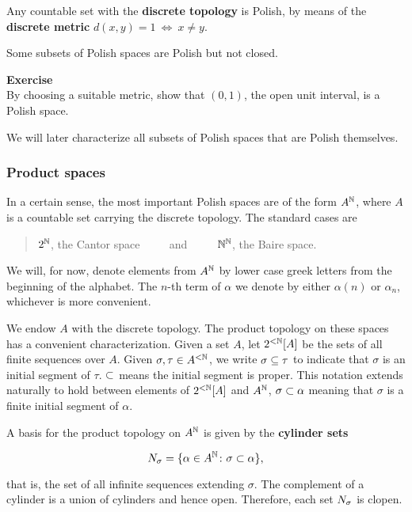 Any countable set with the \textbf{discrete topology} is Polish, by means of the \textbf{discrete metric} $d(x,y) = 1 \: \Leftrightarrow \: x \neq y$.

Some subsets of Polish spaces are Polish but not closed.

\begin{framed}
\textbf{Exercise}\\
By choosing a suitable metric, show that $(0,1)$, the open unit interval, is a Polish space.
\end{framed}

We will later characterize all subsets of Polish spaces that are Polish themselves.

\subsubsection{Product spaces}\label{polish-product-spaces}

In a certain sense, the most important Polish spaces are of the form $A^{\mathbb{N}}$, where $A$ is a countable set carrying the discrete topology. The standard cases are

\begin{quote}
$2^{\mathbb{N}}$, the Cantor space $\qquad$ and $\qquad$ $\mathbb{N}^{\mathbb{N}}$, the Baire space.
\end{quote}

We will, for now, denote elements from $A^{\mathbb{N}}$ by lower case greek letters from the beginning of the alphabet. The $n$-th term of $\alpha$ we denote by either $\alpha(n)$ or $\alpha_n$, whichever is more convenient.

We endow $A$ with the discrete topology.
The product topology on these spaces has a convenient characterization. Given a set $A$, let $2^{<\mathbb{N}}[A]$ be the sets of all finite sequences over $A$.
Given $\sigma, \tau \in A^{<\mathbb{N}}$, we write $\sigma \subseteq \tau$ to indicate that $\sigma$ is an initial segment of $\tau$. $\subset$ means the initial segment is proper. This notation extends naturally to hold between elements of $2^{<\mathbb{N}}[A]$ and $A^{\mathbb{N}}$, $\sigma \subset \alpha$ meaning that $\sigma$ is a finite initial segment of $\alpha$.

A basis for the product topology on $A^{\mathbb{N}}$ is given by the \textbf{cylinder sets}

\begin{equation}
N_{\sigma} = \{\alpha \in A^{\mathbb{N}} \colon \sigma \subset \alpha \},
\end{equation}

that is, the set of all infinite sequences extending $\sigma$. The complement of a cylinder is a union of cylinders and hence open. Therefore, each set $N_{\sigma}$ is clopen.

